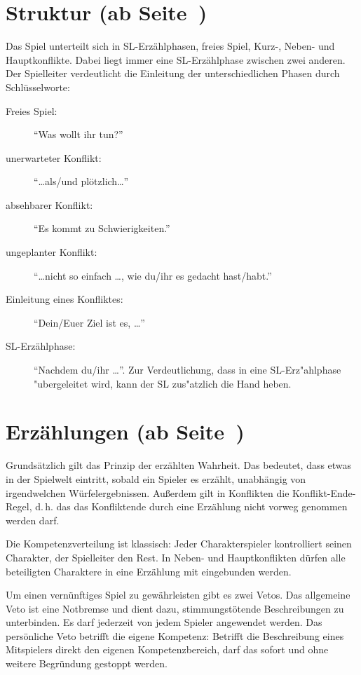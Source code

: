 \section[Struktur]{Struktur (ab Seite~\pageref{Ch:Struktur})}
Das Spiel unterteilt sich in SL-Erzählphasen, freies Spiel, Kurz-, Neben- und Hauptkonflikte. Dabei liegt immer eine SL-Erzählphase zwischen zwei anderen. Der Spielleiter verdeutlicht die Einleitung der unterschiedlichen Phasen durch Schlüsselworte:
\begin{description}
\item[Freies Spiel:] ``Was wollt ihr tun?''

\item[unerwarteter Konflikt:] ``\dots als/und plötzlich\dots''

\item[absehbarer Konflikt:] ``Es kommt zu Schwierigkeiten.''

\item[ungeplanter Konflikt:] ``\dots nicht so einfach \dots, wie du/ihr es gedacht hast/habt.''

\item[Einleitung eines Konfliktes:] ``Dein/Euer Ziel ist es, \dots''

\item[SL-Erzählphase:] ``Nachdem du/ihr \dots''. Zur Verdeutlichung, dass in eine SL-Erz"ahlphase "ubergeleitet wird, kann der SL zus"atzlich die Hand heben.
\end{description}


\section[Erzählungen]{Erzählungen (ab Seite~\pageref{Ch:Erzaehlungen})}
Grundsätzlich gilt das Prinzip der erzählten Wahrheit. Das bedeutet, dass etwas in der Spielwelt eintritt, sobald ein Spieler es erzählt, unabhängig von irgendwelchen Würfelergebnissen. Außerdem gilt in Konflikten die Konflikt-Ende-Regel, d.\,h. das das Konfliktende durch eine Erzählung nicht vorweg genommen werden darf.

Die Kompetenzverteilung ist klassisch: Jeder Charakterspieler kontrolliert seinen Charakter, der Spielleiter den Rest. In Neben- und Hauptkonflikten dürfen alle beteiligten Charaktere in eine Erzählung mit eingebunden werden.

Um einen vernünftiges Spiel zu gewährleisten gibt es zwei Vetos. Das allgemeine Veto ist eine Notbremse und dient dazu, stimmungstötende Beschreibungen zu unterbinden. Es darf jederzeit von jedem Spieler angewendet werden. Das persönliche Veto betrifft die eigene Kompetenz: Betrifft die Beschreibung eines Mitspielers direkt den eigenen Kompetenzbereich, darf das sofort und ohne weitere Begründung gestoppt werden.

